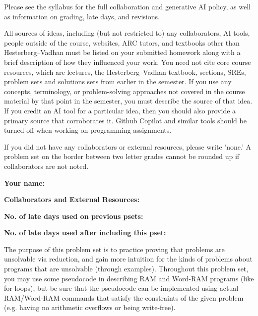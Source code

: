 \documentclass[11pt]{article}
\begin{document}

Please see the syllabus for the full collaboration and generative AI policy, as well as information on grading, late days, and revisions.

All sources of ideas, including (but not restricted to) any collaborators, AI tools, people outside of the course, websites, ARC tutors, and textbooks other than Hesterberg--Vadhan must be listed on your submitted homework along with a brief description of how they influenced your work. You need not cite core course resources, which are lectures, the Hesterberg--Vadhan textbook, sections, SREs, problem sets and solutions sets from earlier in the semester. If you use any concepts, terminology, or problem-solving approaches not covered in the course material by that point in the semester, you must describe the source of that idea. If you credit an AI tool for a particular idea, then you should also provide a primary source that corroborates it. Github Copilot and similar tools should be turned off when working on programming assignments.

If you did not have any collaborators or external resources, please write 'none.' A problem set on the border between two letter grades cannot be rounded up if collaborators are not noted.

\vspace{1em}

\textbf{Your name: }

\textbf{Collaborators and External Resources:}

\textbf{No. of late days used on previous psets: }

\textbf{No. of late days used after including this pset: }

\vspace{0.2in}

\noindent The purpose of this problem set is to practice proving that problems are unsolvable via reduction, and gain more intuition for the kinds of problems about programs that are unsolvable (through examples).
Throughout this problem set, you may use some pseudocode in describing RAM and Word-RAM programs (like for loops), but be sure that the pseudocode can be implemented using actual RAM/Word-RAM commands that satisfy the constraints of the given problem (e.g. having no arithmetic overflows or being write-free).
\end{document}

